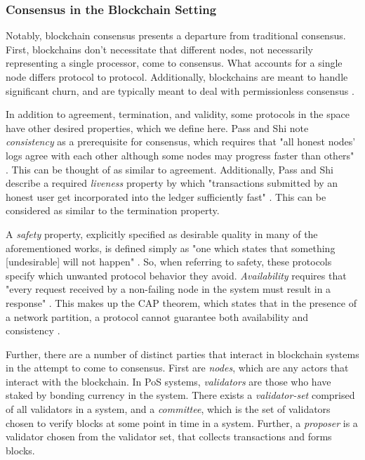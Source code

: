 \documentclass[10pt,journal,compsoc]{IEEEtran}
\begin{document}
\subsubsection{Consensus in the Blockchain Setting}
Notably, blockchain consensus presents a departure from traditional consensus. %
First, blockchains don't necessitate that different nodes, not necessarily representing a single processor, come to consensus. What accounts for a single node differs protocol to protocol. Additionally, blockchains are meant to handle significant churn, and are typically meant to deal with permissionless consensus \cite{Rethinking}. 

In addition to agreement, termination, and validity, some protocols in the space have other desired properties, which we define here. Pass and Shi note \emph{consistency} as a prerequisite for consensus, which requires that "all honest nodes’ logs agree with each other although some nodes may progress faster than others" \cite{Rethinking}. This can be thought of as similar to agreement. Additionally, Pass and Shi describe a required \emph{liveness} property by which "transactions submitted by an honest user get incorporated into the ledger sufficiently fast" \cite{fruitchains}. This can be considered as similar to the termination property.

A \emph{safety} property, explicitly specified as desirable quality in many of the aforementioned works, is defined simply as "one which states that something [undesirable] will not happen" \cite{LamportMultiprocess}. So, when referring to safety, these protocols specify which unwanted protocol behavior they avoid. \emph{Availability} requires that "every request received by a non-failing node in the system must result in a response" \cite{GilbertLynch}. This makes up the CAP theorem, which states that in the presence of a network partition, a protocol cannot guarantee both availability and consistency \cite{GilbertLynch}.

Further, there are a number of distinct parties that interact in blockchain systems in the attempt to come to consensus. First are \emph{nodes}, which are any actors that interact with the blockchain. In PoS systems, \emph{validators} are those who have staked by bonding currency in the system. There exists a \emph{validator-set} comprised of all validators in a system, and a \emph{committee}, which is the set of validators chosen to verify blocks at some point in time in a system. Further, a \emph{proposer} is a validator chosen from the validator set, that collects transactions and forms blocks.
 
\end{document}
